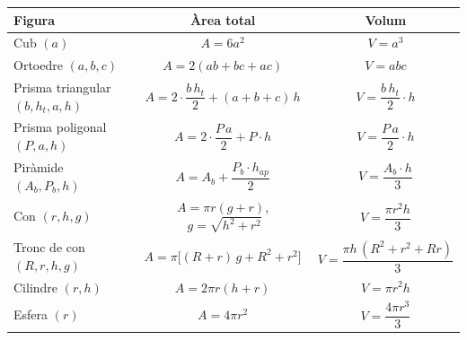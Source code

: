 \begin{table}[H]
\centering
\renewcommand{\arraystretch}{1.25}
\begin{tabular}{lcc}
\toprule
Figura & Àrea total & Volum \\
\midrule
Cub $(a)$ & $A = 6a^2$ & $V = a^3$ \\
Ortoedre $(a, b, c)$ & $A = 2(ab + bc + ac)$ & $V = abc$ \\
Prisma triangular $(b, h_t, a, h)$ & $A = 2\cdot\dfrac{b\,h_t}{2} + (a + b + c)\,h$ & $V = \dfrac{b\,h_t}{2}\cdot h$ \\
Prisma poligonal $(P, a, h)$ & $A = 2\cdot\dfrac{P\,a}{2} + P\cdot h$ & $V = \dfrac{P\,a}{2}\cdot h$ \\
Piràmide $(A_b, P_b, h)$ & $A = A_b + \dfrac{P_b\cdot h_{ap}}{2}$ & $V = \dfrac{A_b\cdot h}{3}$ \\
Con $(r, h, g)$ & $A = \pi r(g + r)$, $\;g = \sqrt{h^2 + r^2}$ & $V = \dfrac{\pi r^2 h}{3}$ \\
Tronc de con $(R, r, h, g)$ & $A = \pi\bigl[(R + r)\,g + R^2 + r^2\bigr]$ & $V = \dfrac{\pi h\,(R^2 + r^2 + Rr)}{3}$ \\
Cilindre $(r, h)$ & $A = 2\pi r(h + r)$ & $V = \pi r^2 h$ \\
Esfera $(r)$ & $A = 4\pi r^2$ & $V = \dfrac{4\pi r^3}{3}$ \\
\bottomrule
\end{tabular}
\end{table}
